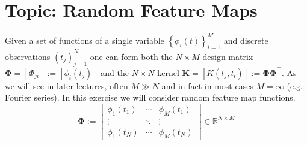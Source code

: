 \documentclass[11pt]{article}
\theoremstyle{plain} %
\theoremstyle{remark}
\begin{document}
\begin{center}

  {}
\end{center}
\vspace{2em}

\tableofcontents

\section{Topic: Random Feature Maps}

Given a set of functions of a single variable
\(\left\{\phi_{i}(t)\right\}_{i=1}^{M}\) and discrete observations
\(\left(t_{j}\right)_{j=1}^{N}\) one can form both the \(N \times M\) design
matrix \(\boldsymbol{\Phi}=\left[\Phi_{j
i}\right]:=\left[\phi_{i}\left(t_{j}\right)\right]\) and the \(N \times N\)
kernel \(\mathbf{K}=\left[K\left(t_{j}, t_{l}\right)\right]:=\boldsymbol{\Phi} \boldsymbol{\Phi}^\top\). As
we will see in later lectures, often \(M \gg N\) and in fact in most cases
\(M=\infty\) (e.g. Fourier series). In this exercise we will consider random feature map functions.
$$
\boldsymbol{\Phi} := \begin{bmatrix}
  \phi_1(t_1) & \cdots & \phi_{M}(t_1) \\
  \vdots & \ddots & \vdots \\
  \phi_1(t_N) & \cdots & \phi_{M}(t_N)
  \end{bmatrix} \in \mathbb{R}^{N \times M}
$$
\end{document}
